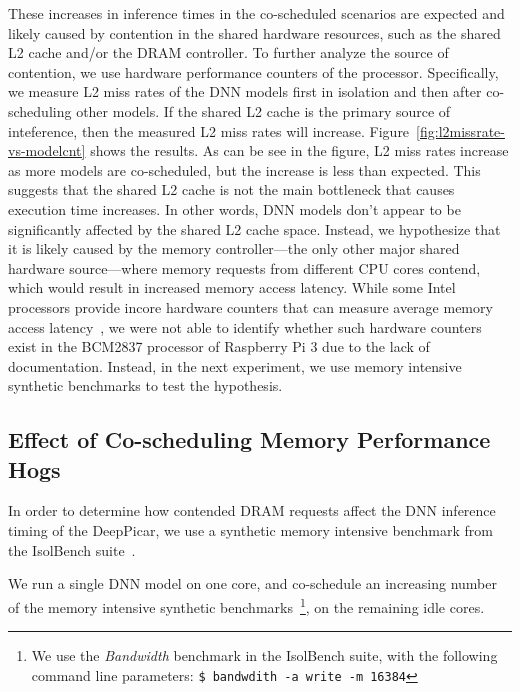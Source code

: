 These increases in inference times in the co-scheduled scenarios are
expected and likely caused by contention in the shared hardware
resources, such as the shared L2 cache and/or the DRAM controller.
To further analyze the source of contention, we use hardware
performance counters of the processor. Specifically, we measure L2
miss rates of the DNN models first in isolation and then after
co-scheduling other models. If the shared L2 cache is the primary
source of inteference, then the measured L2 miss rates will
increase. Figure~\ref{fig:l2missrate-vs-modelcnt} shows the results.
As can be see in the figure, L2 miss rates increase as more models are 
co-scheduled, but the increase is less than expected.
This suggests that the shared L2 cache is not the main bottleneck that 
causes execution time increases. In other words, DNN models don't appear 
to be significantly affected by the shared L2 cache space. 
Instead, we hypothesize that it is likely caused by the memory
controller---the only other major shared hardware source---where
memory requests from different CPU cores contend, which would result
in increased memory access latency. While some Intel processors
provide incore hardware counters that can measure average memory
access latency~\cite{ye2016maracas}, we were not able to identify
whether such hardware counters exist in the BCM2837 processor of
Raspberry Pi 3 due to the lack of documentation. Instead, in the next
experiment, we use memory intensive synthetic benchmarks to test the
hypothesis.

\subsection{Effect of Co-scheduling Memory Performance Hogs}\label{sec:eval-memhog}

In order to determine how contended DRAM requests affect the DNN
inference timing of the DeepPicar, we use a synthetic memory
intensive benchmark from the IsolBench suite~\cite{Valsan2016}.

We run a single DNN model on one core, and
co-schedule an increasing number of the memory intensive synthetic
benchmarks~\footnote{We use the \emph{Bandwidth} benchmark in the
  IsolBench suite, with the following command line parameters: \texttt{\$
  bandwdith -a write -m 16384}}, on the remaining idle cores.

